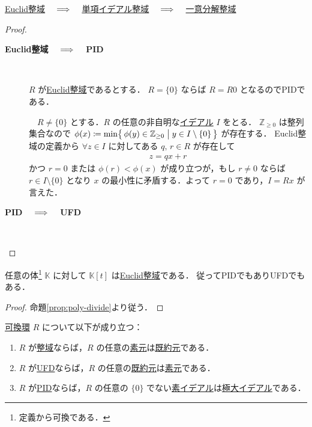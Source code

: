 \documentclass[rep_main]{subfiles}
\begin{document}
\begin{mytheo}[label=thm:ED-PID-UFD]{}
    \hyperref[def:domains]{Euclid整域} $\quad \Longrightarrow \quad$ \hyperref[def:domains]{単項イデアル整域} $\quad \Longrightarrow \quad$ \hyperref[def:domains]{一意分解整域}
\end{mytheo}

\begin{proof}
    \begin{description}
        \item[\textbf{Euclid整域 $\quad \Longrightarrow \quad$ PID}]　
        
        $R$ が\hyperref[def:domains]{Euclid整域}であるとする．
        $R = \{0\}$ ならば $R = R0$ となるのでPIDである．
        
        　$R \neq \{0\}$ とする．$R$ の任意の非自明な\hyperref[def:ideal-ring]{イデアル} $I$ をとる．
        $\mathbb{Z}_{\ge 0}$ は整列集合なので $\phi(x) \coloneqq \min \bigl\{\, \phi(y) \in \mathbb{Z}_{\ge 0} \bigm| y \in I \setminus \{0\} \,\bigr\}$ が存在する．
        Euclid整域の定義から $\forall z \in I$ に対してある $q,\, r \in R$ が存在して
        \begin{align}
            z = qx + r
        \end{align}
        かつ $r = 0$ または $\phi(r) < \phi(x)$ が成り立つが，もし $r \neq 0$ ならば $r \in I \setminus \{0\}$ となり $x$ の最小性に矛盾する．よって $r = 0$ であり，$I = Rx$ が言えた．

        \item[\textbf{PID $\quad \Longrightarrow \quad$ UFD}]　
        

    \end{description}
    
\end{proof}

\begin{mycol}[label=col:poly-PID]{}
    任意の体\footnote{定義から可換である．} $\mathbb{K}$ に対して $\mathbb{K}[t]$ は\hyperref[def:domains]{Euclid整域}である．
    従ってPIDでもありUFDでもある．
\end{mycol}

\begin{proof}
    命題\ref{prop:poly-divide}より従う．
\end{proof}


\begin{myprop}[label=prop:PID-prime]{}
    \underline{可換環} $R$ について以下が成り立つ：
    \begin{enumerate}
        \item $R$ が\hyperref[def:domain-basic]{整域}ならば，$R$ の任意の\hyperref[def:domain-basic]{素元}は\hyperref[def:domain-basic]{既約元}である．
        \item $R$ が\hyperref[def:domains]{UFD}ならば，$R$ の任意の\hyperref[def:domain-basic]{既約元}は\hyperref[def:domain-basic]{素元}である．
        \item $R$ が\hyperref[def:domains]{PID}ならば，$R$ の任意の $\{0\}$ でない\hyperref[def:ideal-ring]{素イデアル}は\hyperref[def:ideal-ring]{極大イデアル}である．
    \end{enumerate}
    
\end{myprop}
\end{document}
